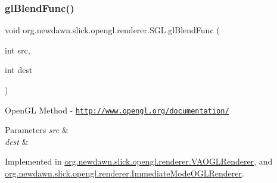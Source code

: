 \mbox{\label{interfaceorg_1_1newdawn_1_1slick_1_1opengl_1_1renderer_1_1_s_g_l_afa605b9f35a519c10dbed88c79be96af}} 
\subsubsection{\texorpdfstring{gl\+Blend\+Func()}{glBlendFunc()}}
{\footnotesize\ttfamily void org.\+newdawn.\+slick.\+opengl.\+renderer.\+S\+G\+L.\+gl\+Blend\+Func (\begin{DoxyParamCaption}\item[{int}]{src,  }\item[{int}]{dest }\end{DoxyParamCaption})}

Open\+GL Method -\/  \href{http://www.opengl.org/documentation/}{\tt http\+://www.\+opengl.\+org/documentation/}


\begin{DoxyParams}{Parameters}
{\em src} & \\
\hline
{\em dest} & \\
\hline
\end{DoxyParams}


Implemented in \mbox{\hyperlink{classorg_1_1newdawn_1_1slick_1_1opengl_1_1renderer_1_1_v_a_o_g_l_renderer_a97ff78c9e3edba2affe402b59e18d848}{org.\+newdawn.\+slick.\+opengl.\+renderer.\+V\+A\+O\+G\+L\+Renderer}}, and \mbox{\hyperlink{classorg_1_1newdawn_1_1slick_1_1opengl_1_1renderer_1_1_immediate_mode_o_g_l_renderer_af241eb86655622bc19f902ff4dd2033d}{org.\+newdawn.\+slick.\+opengl.\+renderer.\+Immediate\+Mode\+O\+G\+L\+Renderer}}.

\mbox{\label{interfaceorg_1_1newdawn_1_1slick_1_1opengl_1_1renderer_1_1_s_g_l_a8482d9603203e93027e90042db3f561a}} 
